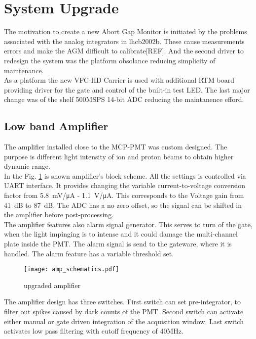 \section{System Upgrade}
The motivation to create a new Abort Gap Monitor is initiated by the problems
associated with the analog integrators in lhcb2002b. These cause measurements
errors and make the AGM difficult to calibrate[REF]. And the second driver to
redesign the system was the platform obsolance reducing simplicity of
maintenance. \\ 
As a platform the new VFC-HD Carrier is used with additional RTM board
providing driver for the gate and control of the built-in test LED. The last
major change was of the shelf 500MSPS 14-bit ADC reducing the maintanence
efford. 

\subsection{Low band Amplifier}
The amplifier installed close to the MCP-PMT was custom designed. The purpose
is different light intensity of ion and proton beams to obtain higher dynamic
range. \\ 
In the Fig. \ref{fig:amp_schematics} is shown amplifier's block scheme. All the
settings is controlled via UART interface. It provides changing the variable
current-to-voltage conversion factor from \SI{5.8}{mV/\micro A} -
\SI{1.1}{V/\micro A}. This corresponds to the Voltage gain from \SI{41}{dB} to
\SI{87}{dB}. The ADC has a no zero offset, so the signal can be shifted in the
amplifier before post-processing.\\
The amplifier features also alarm signal generator. This serves to turn of the
gate, when the light impinging is to intense and it could damage the
multi-channel plate inside the PMT. The alarm signal is send to the gateware,
where it is handled. The alarm feature has a variable threshold set.   
\begin{figure}[!tbh]
    \centering
    \texttt{[image: amp\_schematics.pdf]}
    \caption{upgraded amplifier}
    \label{fig:amp_schematics}
\end{figure}
The amplifier design has three switches. First switch can set pre-integrator,
to filter out spikes caused by dark counts of the PMT. Second switch can
activate either manual or gate driven integration of the acquisition window.  
Last switch activates low pass filtering with cutoff frequency of 40MHz.

